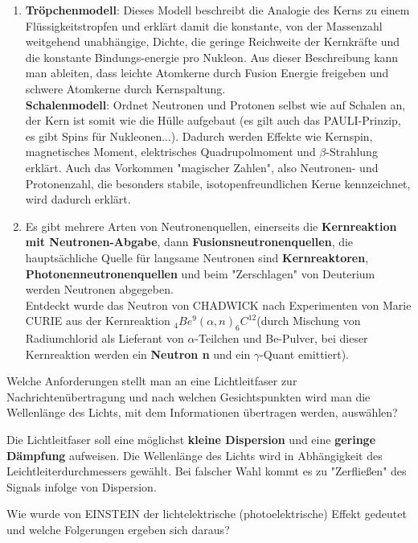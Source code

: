 \documentclass[12pt,a4paper,ngerman]{article}
\begin{document}
\begin{enumerate}
\item \textbf{Tröpchenmodell}: Dieses Modell beschreibt die Analogie des Kerns zu einem \\ Flüssigkeitstropfen und erklärt damit die konstante, von der Massenzahl weitgehend unabhängige, Dichte, die geringe Reichweite der Kernkräfte und die konstante Bindungs-energie pro Nukleon. Aus dieser Beschreibung kann man ableiten, dass leichte Atomkerne durch Fusion Energie freigeben und schwere Atomkerne durch Kernspaltung. \\
\textbf{Schalenmodell}: Ordnet Neutronen und Protonen selbst wie auf Schalen an, der Kern ist somit wie die Hülle aufgebaut (es gilt auch das PAULI-Prinzip, es gibt Spins für Nukleonen...). Dadurch werden Effekte wie Kernspin, magnetisches Moment, elektrisches Quadrupolmoment und $\beta$-Strahlung erklärt. Auch das Vorkommen "magischer Zahlen", also Neutronen- und Protonenzahl, die besonders stabile, isotopenfreundlichen Kerne kennzeichnet, wird dadurch erklärt. 
\item Es gibt mehrere Arten von Neutronenquellen, einerseits die \textbf{Kernreaktion mit Neutronen-Abgabe}, dann \textbf{Fusionsneutronenquellen}, die hauptsächliche Quelle für langsame Neutronen sind \textbf{Kernreaktoren}, \textbf{Photonenneutronenquellen} und beim "Zerschlagen" von Deuterium werden Neutronen abgegeben. \\
Entdeckt wurde das Neutron von CHADWICK nach Experimenten von Marie CURIE aus der Kernreaktion $_4Be^9(\alpha,n) _6C^{12}$(durch Mischung von Radiumchlorid als Lieferant von $\alpha$-Teilchen und Be-Pulver, bei dieser Kernreaktion werden ein \textbf{Neutron n} und ein $\gamma$-Quant emittiert).
\end{enumerate}


\begin{framed}
Welche Anforderungen stellt man an eine Lichtleitfaser zur Nachrichtenübertragung und nach welchen Gesichtspunkten wird man die Wellenlänge des Lichts, mit dem Informationen übertragen werden, auswählen?
\end{framed}

Die Lichtleitfaser soll eine möglichst \textbf{kleine Dispersion} und eine \textbf{geringe Dämpfung} aufweisen. Die Wellenlänge des Lichts wird in Abhängigkeit des Leichtleiterdurchmessers gewählt. Bei falscher Wahl kommt es zu "Zerfließen" des Signals infolge von Dispersion. 


\pagebreak


\begin{framed}
Wie wurde von EINSTEIN der lichtelektrische (photoelektrische) Effekt gedeutet und welche Folgerungen ergeben sich daraus?
\end{framed}
\end{document}
